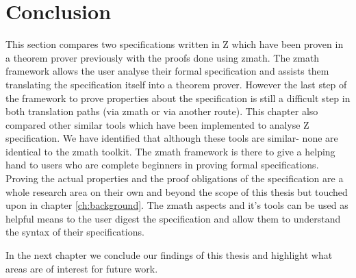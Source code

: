 \section{Conclusion}
This section compares two specifications written in Z which have been proven in a
theorem prover previously with the proofs done using \gls{zmath}. The
\gls{zmath} framework allows the user analyse their formal specification and
assists them translating the specification itself into a theorem prover. However
the last step of the framework to prove properties about the specification is
still a difficult step in both translation paths (via \gls{zmath} or via another
route). This chapter also compared other similar tools which have been
implemented to analyse Z specification. We have identified that although these
tools are similar- none are identical to the \gls{zmath} toolkit.
The \gls{zmath} framework is there to give a helping hand to
users who are complete beginners in proving formal specifications. Proving the
actual properties and the proof obligations of the specification are a whole
research area on their own and beyond the scope of this thesis but touched upon
in chapter \ref{ch:background}. The \gls{zmath} aspects and it's tools can be used as helpful means to the user digest 
the specification and allow them to understand the syntax of their specifications.

In the next chapter we conclude our findings of this thesis and highlight what
areas are of interest for future work.
